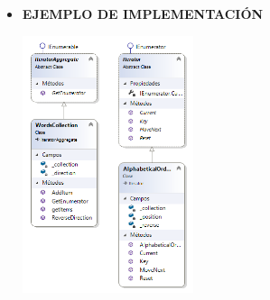 \documentclass[twoside,twocolumn]{article}
\begin{document}
\begin{itemize}
\begin{itemize}
\begin{itemize}
\begin{itemize}
        \end{itemize} 

    \item \textbf{EJEMPLO DE IMPLEMENTACIÓN}
    \begin{center}
        \includegraphics[width=5cm]{./img/imagen12.png} 
    \end{center}
	

\end{itemize}
\end{itemize}
\end{itemize}
\end{document}
